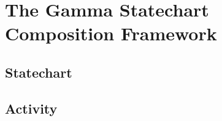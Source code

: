 \section{The Gamma Statechart Composition Framework}\label{sec:gamma}

\subsection{Statechart}

\subsection{Activity}
